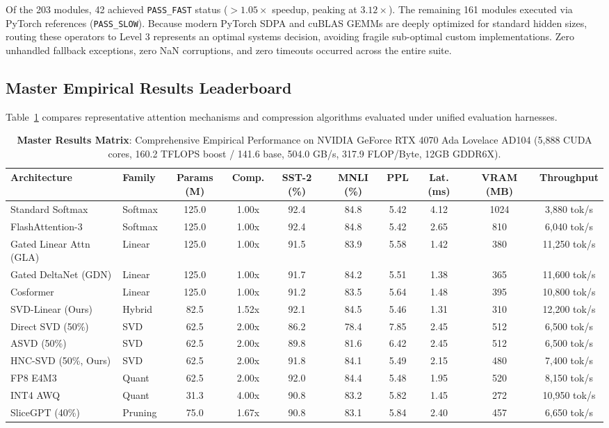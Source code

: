 \documentclass{article}
\newcommand{\passfast}{\texttt{PASS\_FAST}}
\newcommand{\passslow}{\texttt{PASS\_SLOW}}
\begin{document}
Of the 203 modules, 42 achieved \passfast{} status ($>1.05\times$ speedup, peaking at $3.12\times$). The remaining 161 modules executed via PyTorch references (\passslow{}). Because modern PyTorch SDPA and cuBLAS GEMMs are deeply optimized for standard hidden sizes, routing these operators to Level 3 represents an optimal systems decision, avoiding fragile sub-optimal custom implementations. Zero unhandled fallback exceptions, zero NaN corruptions, and zero timeouts occurred across the entire suite.

\subsection{Master Empirical Results Leaderboard}
Table~\ref{tab:master_results_matrix} compares representative attention mechanisms and compression algorithms evaluated under unified evaluation harnesses.

\begin{table}[t]
\centering
\scriptsize
\setlength{\tabcolsep}{3.5pt}
\caption{\textbf{Master Results Matrix}: Comprehensive Empirical Performance on NVIDIA GeForce RTX 4070 Ada Lovelace AD104 (5,888 CUDA cores, 160.2 TFLOPS boost / 141.6 base, 504.0 GB/s, 317.9 FLOP/Byte, 12GB GDDR6X).}
\label{tab:master_results_matrix}
\begin{tabular}{llcccccccc}
\toprule
\textbf{Architecture} & \textbf{Family} & \textbf{Params (M)} & \textbf{Comp.} & \textbf{SST-2 (\%)} & \textbf{MNLI (\%)} & \textbf{PPL} & \textbf{Lat. (ms)} & \textbf{VRAM (MB)} & \textbf{Throughput} \\
\midrule
Standard Softmax & Softmax & 125.0 & 1.00x & 92.4 & 84.8 & 5.42 & 4.12 & 1024 & 3,880 tok/s \\
FlashAttention-3 & Softmax & 125.0 & 1.00x & 92.4 & 84.8 & 5.42 & 2.65 & 810 & 6,040 tok/s \\
Gated Linear Attn (GLA) & Linear & 125.0 & 1.00x & 91.5 & 83.9 & 5.58 & 1.42 & 380 & 11,250 tok/s \\
Gated DeltaNet (GDN) & Linear & 125.0 & 1.00x & 91.7 & 84.2 & 5.51 & 1.38 & 365 & 11,600 tok/s \\
Cosformer & Linear & 125.0 & 1.00x & 91.2 & 83.5 & 5.64 & 1.48 & 395 & 10,800 tok/s \\
SVD-Linear (Ours) & Hybrid & 82.5 & 1.52x & 92.1 & 84.5 & 5.46 & 1.31 & 310 & 12,200 tok/s \\
Direct SVD (50\%) & SVD & 62.5 & 2.00x & 86.2 & 78.4 & 7.85 & 2.45 & 512 & 6,500 tok/s \\
ASVD (50\%) & SVD & 62.5 & 2.00x & 89.8 & 81.6 & 6.42 & 2.45 & 512 & 6,500 tok/s \\
HNC-SVD (50\%, Ours) & SVD & 62.5 & 2.00x & 91.8 & 84.1 & 5.49 & 2.15 & 480 & 7,400 tok/s \\
FP8 E4M3 & Quant & 62.5 & 2.00x & 92.0 & 84.4 & 5.48 & 1.95 & 520 & 8,150 tok/s \\
INT4 AWQ & Quant & 31.3 & 4.00x & 90.8 & 83.2 & 5.82 & 1.45 & 272 & 10,950 tok/s \\
SliceGPT (40\%) & Pruning & 75.0 & 1.67x & 90.8 & 83.1 & 5.84 & 2.40 & 457 & 6,650 tok/s \\
\bottomrule
\end{tabular}
\end{table}
\end{document}
